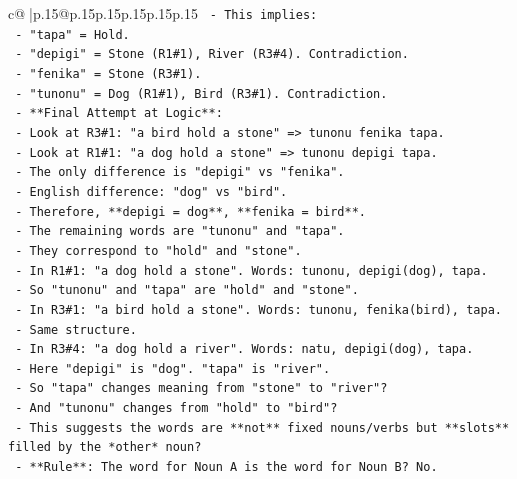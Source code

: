 \documentclass{article}
\begin{document}
{\begin{supertabular}{c@{$\;$}|p{.15\linewidth}@{}p{.15\linewidth}p{.15\linewidth}p{.15\linewidth}p{.15\linewidth}p{.15\linewidth}}
{{{\texttt{                {-} This implies:} \\
\texttt{                  {-} "tapa" = Hold.} \\
\texttt{                  {-} "depigi" = Stone (R1\#1), River (R3\#4). Contradiction.} \\
\texttt{                  {-} "fenika" = Stone (R3\#1).} \\
\texttt{                  {-} "tunonu" = Dog (R1\#1), Bird (R3\#1). Contradiction.} \\
\texttt{      {-} **Final Attempt at Logic**:} \\
\texttt{        {-} Look at R3\#1: "a bird hold a stone" => tunonu fenika tapa.} \\
\texttt{        {-} Look at R1\#1: "a dog hold a stone" => tunonu depigi tapa.} \\
\texttt{        {-} The only difference is "depigi" vs "fenika".} \\
\texttt{        {-} English difference: "dog" vs "bird".} \\
\texttt{        {-} Therefore, **depigi = dog**, **fenika = bird**.} \\
\texttt{        {-} The remaining words are "tunonu" and "tapa".} \\
\texttt{        {-} They correspond to "hold" and "stone".} \\
\texttt{        {-} In R1\#1: "a dog hold a stone". Words: tunonu, depigi(dog), tapa.} \\
\texttt{          {-} So "tunonu" and "tapa" are "hold" and "stone".} \\
\texttt{        {-} In R3\#1: "a bird hold a stone". Words: tunonu, fenika(bird), tapa.} \\
\texttt{          {-} Same structure.} \\
\texttt{        {-} In R3\#4: "a dog hold a river". Words: natu, depigi(dog), tapa.} \\
\texttt{          {-} Here "depigi" is "dog". "tapa" is "river".} \\
\texttt{          {-} So "tapa" changes meaning from "stone" to "river"?} \\
\texttt{          {-} And "tunonu" changes from "hold" to "bird"?} \\
\texttt{          {-} This suggests the words are **not** fixed nouns/verbs but **slots** filled by the *other* noun?} \\
\texttt{          {-} **Rule**: The word for Noun A is the word for Noun B? No.} \\
}}}
\end{supertabular}}
\end{document}
